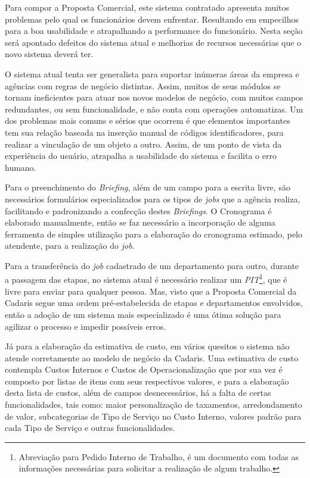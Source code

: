 \documentclass[
  12pt,				%
  openany,
  oneside,
  a4paper,			%
  english,			%
  brazil
]{article}
\numberwithin{figure}{section}
\numberwithin{table}{section}
\begin{document}
Para compor a Proposta Comercial, este sistema contratado apresenta muitos problemas pelo qual os funcionários devem enfrentar. Resultando em empecilhos para a boa usabilidade e atrapalhando a performance do funcionário. Nesta seção será apontado defeitos do sistema atual e melhorias de recursos necessárias que o novo sistema deverá ter.

O sistema atual tenta ser generalista para suportar inúmeras áreas da empresa e agências com regras de negócio distintas. Assim, muitos de seus módulos se tornam ineficientes para atuar nos novos modelos de negócio, com muitos campos redundantes, ou sem funcionalidade, e não conta com operações automatizas. Um dos problemas mais comuns e sérios que ocorrem é que elementos importantes tem sua relação baseada na inserção manual de códigos identificadores, para realizar a vinculação de um objeto a outro. Assim, de um ponto de vista da experiência do usuário, atrapalha a usabilidade do sistema e facilita o erro humano.

Para o preenchimento do \textit{Briefing}, além de um campo para a escrita livre, são necessários formulários especializados para os tipos de \textit{jobs} que a agência realiza, facilitando e padronizando a confecção destes \textit{Briefings}. O Cronograma é elaborado manualmente, então se faz necessário a incorporação de alguma ferramenta de simples utilização para a elaboração do cronograma estimado, pelo atendente, para a realização do \textit{job}.

Para a transferência do \textit{job} cadastrado de um departamento para outro, durante a passagem das etapas, no sistema atual é necessário realizar um \textit{PIT}\footnote{Abreviação para Pedido Interno de Trabalho, é um documento com todas as informações necessárias para solicitar a realização de algum trabalho.}, que é livre para enviar para qualquer pessoa. Mas, visto que a Proposta Comercial da Cadaris segue uma ordem pré-estabelecida de etapas e departamentos envolvidos, então a adoção de um sistema mais especializado é uma ótima solução para agilizar o processo e impedir possíveis erros.

Já para a elaboração da estimativa de custo, em vários quesitos o sistema não atende corretamente ao modelo de negócio da Cadaris. Uma estimativa de custo contempla Custos Internos e Custos de Operacionalização que por sua vez é composto por listas de itens com seus respectivos valores, e para a elaboração desta lista de custos, além de campos desnecessários, há a falta de certas funcionalidades, tais como: maior personalização de taxamentos, arredondamento de valor, subcategorias de Tipo de Serviço no Custo Interno, valores padrão para cada Tipo de Serviço e outras funcionalidades.
\end{document}
